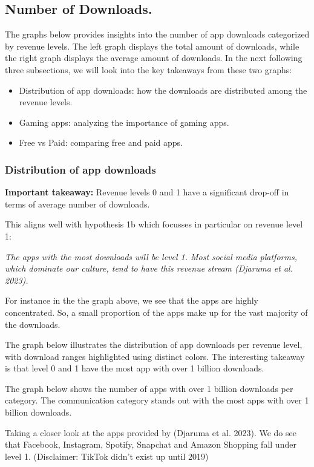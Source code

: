 \documentclass[
  12pt,
  a4paper,
]{article}
\begin{document}
\subsection{Number of Downloads.}\label{number-of-downloads.}

The graphs below provides insights into the number of app downloads
categorized by revenue levels. The left graph displays the total amount
of downloads, while the right graph displays the average amount of
downloads. In the next following three subsections, we will look into
the key takeaways from these two graphs:

\begin{itemize}
\item
  Distribution of app downloads: how the downloads are distributed among
  the revenue levels.
\item
  Gaming apps: analyzing the importance of gaming apps.
\item
  Free vs Paid: comparing free and paid apps.
\end{itemize}

\subsubsection{Distribution of app
downloads}\label{distribution-of-app-downloads}

\textbf{Important takeaway:} Revenue levels 0 and 1 have a significant
drop-off in terms of average number of downloads.

This aligns well with hypothesis 1b which focusses in particular on
revenue level 1:

\emph{The apps with the most downloads will be level 1. Most social
media platforms, which dominate our culture, tend to have this revenue
stream (Djaruma et al. 2023).}

For instance in the the graph above, we see that the apps are highly
concentrated. So, a small proportion of the apps make up for the vast
majority of the downloads.

The graph below illustrates the distribution of app downloads per
revenue level, with download ranges highlighted using distinct colors.
The interesting takeaway is that level 0 and 1 have the most app with
over 1 billion downloads.

The graph below shows the number of apps with over 1 billion downloads
per category. The communication category stands out with the most apps
with over 1 billion downloads.

Taking a closer look at the apps provided by (Djaruma et al. 2023). We
do see that Facebook, Instagram, Spotify, Snapchat and Amazon Shopping
fall under level 1. (Disclaimer: TikTok didn't exist up until 2019)
\end{document}
